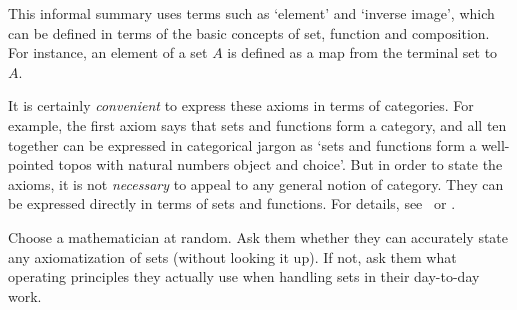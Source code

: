 This informal summary uses terms such as `element' and `inverse image',
which can be defined in terms of the basic concepts of set, function and
composition.  For instance, an element of a set $A$ is defined as a map from
the terminal set to $A$.

It is certainly \emph{convenient} to express these axioms in terms of
categories.  For example, the first axiom says that sets and functions form
a category, and all ten together can be expressed in categorical jargon as
`sets and functions form a well-pointed topos%
%
%
%
with natural numbers object and choice'.  But in order to state the axioms,
it is not \emph{necessary} to appeal to any general notion of category.
They can be expressed directly in terms of sets and functions.  For
details, see \citeLR\ or \citeRST.%
%
%
%
%
%


\exone


\begin{question}
Choose a mathematician at random.  Ask them whether they can accurately
state any axiomatization of sets (without looking it up).  If not, ask them
what operating principles they actually use when handling sets in their
day-to-day work.
\end{question}
